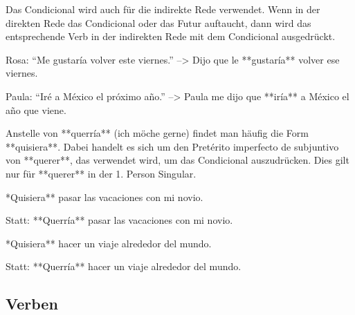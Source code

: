 Das Condicional wird auch für die indirekte Rede verwendet. Wenn in der direkten Rede das Condicional oder das Futur auftaucht, dann wird das entsprechende Verb in der indirekten Rede mit dem Condicional ausgedrückt.

\begin{compactitem}
    \item Rosa: "`Me gustaría volver este viernes."' --> Dijo que le **gustaría** volver ese viernes.
    \item Paula: "`Iré a México el próximo año."' --> Paula me dijo que **iría** a México el año que viene.
\end{compactitem}

\begin{hint}
\danger{}
Anstelle von **querría** (ich möche gerne) findet man häufig die Form **quisiera**.
Dabei handelt es sich um den Pretérito imperfecto de subjuntivo von **querer**, das
verwendet wird, um das Condicional auszudrücken. Dies gilt nur für **querer** in der 1. Person
Singular.
\end{hint}

\begin{compactitem}
    \item **Quisiera** pasar las vacaciones con mi novio.
    \begin{compactitem}\itshape
        \item Statt: **Querría** pasar las vacaciones con mi novio.
    \end{compactitem}
    \item **Quisiera** hacer un viaje alrededor del mundo.
    \begin{compactitem}\itshape
        \item Statt: **Querría** hacer un viaje alrededor del mundo.
    \end{compactitem}
\end{compactitem}


\subsection*{Verben}

